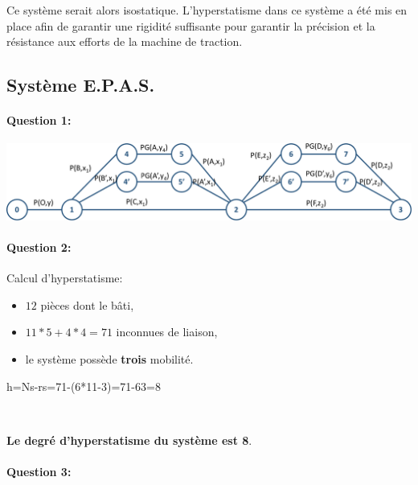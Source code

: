 Ce système serait alors isostatique. L'hyperstatisme dans ce système a été mis en place afin de garantir une rigidité suffisante pour garantir la précision et la résistance aux efforts de la machine de traction.

\newpage

\subsection{Système E.P.A.S.}

\paragraph{Question 1:}

\begin{center}
 \includegraphics[width=0.9\linewidth]{img/graphe_liaisons}
\end{center}

\paragraph{Question 2:} Calcul d'hyperstatisme:
\begin{itemize}
 \item $12$ pièces dont le bâti,
 \item $11*5+4*4=71$ inconnues de liaison,
 \item le système possède \textbf{trois} mobilité.
\end{itemize}

h=Ns-rs=71-(6*11-3)=71-63=8

~\

\textbf{Le degré d'hyperstatisme du système est 8}.

\paragraph{Question 3:} ~\ \\

